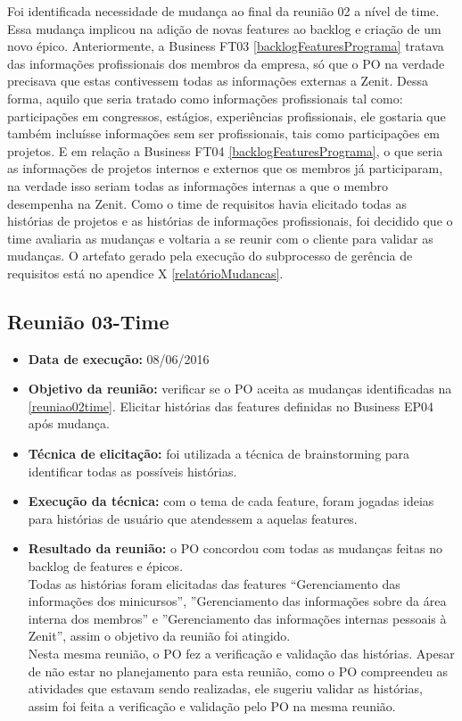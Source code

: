  Foi identificada necessidade de mudança ao final da reunião 02 a nível de time. Essa mudança implicou na adição de novas features ao backlog e criação de um novo épico.
 Anteriormente, a Business FT03 \ref{backlogFeaturesPrograma} tratava das informações profissionais dos membros da empresa, só que o PO na verdade precisava que estas contivessem todas as informações externas a Zenit. Dessa forma, aquilo que seria tratado como informações profissionais tal como: participações em congressos, estágios, experiências profissionais, ele gostaria que também incluísse informações sem ser profissionais, tais como participações em projetos.
 E em relação a Business FT04 \ref{backlogFeaturesPrograma}, o que seria as informações de projetos internos e externos que os membros já participaram, na verdade isso seriam todas as informações internas a que o membro desempenha na Zenit.
 Como o time de requisitos havia elicitado todas as histórias de projetos e as histórias de informações profissionais, foi decidido que o time avaliaria as mudanças e voltaria a se reunir com o cliente para validar as mudanças.
 O artefato gerado pela execução do subprocesso de gerência de requisitos está no apendice X \ref{relatórioMudancas}.

\subsection{Reunião 03-Time}
\begin{itemize}
 \item \textbf{Data de execução:} 08/06/2016
 \item \textbf{Objetivo da reunião:} verificar se o PO aceita as mudanças identificadas na \ref{reuniao02time}. Elicitar histórias das features definidas no Business EP04 após mudança. 
 \item \textbf{Técnica de elicitação:} foi utilizada a técnica de brainstorming para identificar todas as possíveis histórias.
 \item \textbf{Execução da técnica:} com o tema de cada feature, foram jogadas ideias para histórias de usuário que atendessem a aquelas features.
 \item \textbf{Resultado da reunião:} o PO concordou com todas as mudanças feitas no backlog de features e épicos.\\
Todas as histórias foram elicitadas das features “Gerenciamento das informações dos minicursos”, ”Gerenciamento das informações sobre da área interna dos membros” e ”Gerenciamento das informações internas pessoais à Zenit”, assim o objetivo da reunião foi atingido.\\
Nesta mesma reunião, o PO fez a verificação e validação das histórias. Apesar de não estar no planejamento para esta reunião, como o PO compreendeu as atividades que estavam sendo realizadas, ele sugeriu validar as histórias, assim foi feita a verificação e validação pelo PO na mesma reunião.
\end{itemize}

